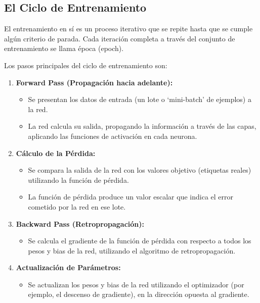 \documentclass{article}
\begin{document}
\subsection{El Ciclo de Entrenamiento}

El entrenamiento en sí es un proceso iterativo que se repite hasta que se cumple algún criterio de parada.  Cada iteración completa a través del conjunto de entrenamiento se llama época (epoch).

Los pasos principales del ciclo de entrenamiento son:

\begin{enumerate}
    \item \textbf{Forward Pass (Propagación hacia adelante):}
        \begin{itemize}
            \item Se presentan los datos de entrada (un lote o `mini-batch' de ejemplos) a la red.
            \item La red calcula su salida, propagando la información a través de las capas, aplicando las funciones de activación en cada neurona.
        \end{itemize}

    \item \textbf{Cálculo de la Pérdida:}
        \begin{itemize}
            \item Se compara la salida de la red con los valores objetivo (etiquetas reales) utilizando la función de pérdida.
            \item La función de pérdida produce un valor escalar que indica el error cometido por la red en ese lote.
        \end{itemize}

    \item \textbf{Backward Pass (Retropropagación):}
        \begin{itemize}
            \item Se calcula el gradiente de la función de pérdida con respecto a todos los pesos y bias de la red, utilizando el algoritmo de retropropagación.
        \end{itemize}

    \item \textbf{Actualización de Parámetros:}
        \begin{itemize}
            \item Se actualizan los pesos y bias de la red utilizando el optimizador (por ejemplo, el descenso de gradiente), en la dirección opuesta al gradiente.
        \end{itemize}


\end{enumerate}
\end{document}

